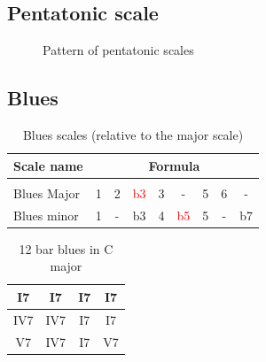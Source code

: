\documentclass{article}
\begin{document}
\newpage
\subsection{Pentatonic scale}
\begin{figure}[h!]
	\centering
	\hspace*{-2cm}
	\scalebox{0.5}{}
	\caption{Pattern of pentatonic scales}
	\label{fig:gammme_penta_manche}
\end{figure}

\newpage
\subsection{Blues}


\begin{table}[!h]
	\caption{Blues scales (relative to the major scale)}
	\centering
	\begin{tabular}{l|cccccccc}
		Scale name  & \multicolumn{8}{c}{Formula} \\
		\hline \hline \vspace{-0.4cm} \\
		Blues Major   & 1 & 2  & \textcolor{red}{b3} & 3  &   -   & 5  & 6  &  -  \\
		Blues minor   & 1 &  - & b3 & 4  & \textcolor{red}{b5} &  5  & - &  b7 \\
	\end{tabular}
	\label{tab: }
\end{table}

\begin{table}[!h]
	\caption{12 bar blues in C major}
	\centering
	\begin{tabular}{| c | c | c | c |}
		\hline
		\phantom{x}I7\phantom{x} & \phantom{x}I7\phantom{x} & \phantom{x}I7\phantom{x} & \phantom{x}I7\phantom{x}  \\
		\hline
		\phantom{x}IV7\phantom{x} & \phantom{x}IV7\phantom{x} & \phantom{x}I7\phantom{x} & \phantom{x}I7\phantom{x}  \\
		\hline
		\phantom{x}V7\phantom{x} & \phantom{x}IV7\phantom{x} & \phantom{x}I7\phantom{x} & \phantom{x}V7\phantom{x}  \\
		\hline
	\end{tabular}
	\label{tab: }
\end{table}
\end{document}
